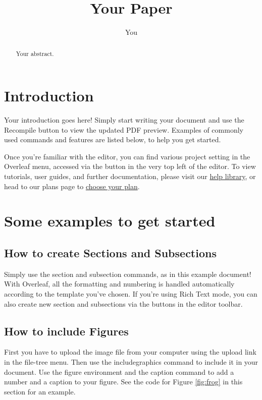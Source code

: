 \documentclass{article}
\title{Your Paper}
\author{You}
\begin{document}
\maketitle
\thispagestyle{firstpage}

\begin{abstract}
Your abstract.
\end{abstract}

\section{Introduction}

Your introduction goes here! Simply start writing your document and use the Recompile button to view the updated PDF preview. Examples of commonly used commands and features are listed below, to help you get started.

Once you're familiar with the editor, you can find various project setting in the Overleaf menu, accessed via the button in the very top left of the editor. To view tutorials, user guides, and further documentation, please visit our \href{https://www.overleaf.com/learn}{help library}, or head to our plans page to \href{https://www.overleaf.com/user/subscription/plans}{choose your plan}.

\section{Some examples to get started}

\subsection{How to create Sections and Subsections}

Simply use the section and subsection commands, as in this example document! With Overleaf, all the formatting and numbering is handled automatically according to the template you've chosen. If you're using Rich Text mode, you can also create new section and subsections via the buttons in the editor toolbar.

\subsection{How to include Figures}

First you have to upload the image file from your computer using the upload link in the file-tree menu. Then use the includegraphics command to include it in your document. Use the figure environment and the caption command to add a number and a caption to your figure. See the code for Figure \ref{fig:frog} in this section for an example.
\end{document}
